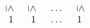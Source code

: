 \begin{frame}
\begin{exampleblock}{}
\begin{displaymath}
\begin{array}{ccccc}
                & & & \begin{array}{cccc}  
                \;\rotatebox[origin=c]{-90}{$\leq$}\;&
                \;\rotatebox[origin=c]{-90}{$\leq$}\;&
                \;\dots\;&
                \;\rotatebox[origin=c]{-90}{$\leq$}\; 
                \end{array}&\\
                & & & \begin{array}{cccc}  \;1\;\;&\;1\;&\;\dots\;&\;1\; \end{array}&
            \end{array}
        \end{displaymath}
    \end{exampleblock}
\end{frame}


